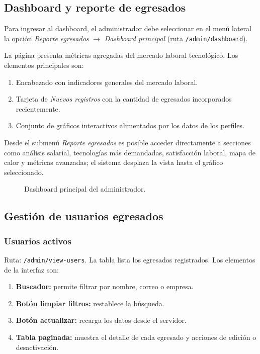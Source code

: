 \subsection{Dashboard y reporte de egresados}
\label{subsec:dashboard-admin}

Para ingresar al dashboard, el administrador debe seleccionar en el menú lateral la opción \emph{Reporte egresados} $\rightarrow$ \emph{Dashboard principal} (ruta \texttt{/admin/dashboard}).

La página presenta métricas agregadas del mercado laboral tecnológico. Los elementos principales son:

\begin{enumerate}
\item Encabezado con indicadores generales del mercado laboral.
\item Tarjeta de \emph{Nuevos registros} con la cantidad de egresados incorporados recientemente.
\item Conjunto de gráficos interactivos alimentados por los datos de los perfiles.
\end{enumerate}

Desde el submenú \emph{Reporte egresados} es posible acceder directamente a secciones como análisis salarial, tecnologías más demandadas, satisfacción laboral, mapa de calor y métricas avanzadas; el sistema desplaza la vista hasta el gráfico seleccionado.

\begin{figure}[H]
\centering
{}
\caption{Dashboard principal del administrador.}
\label{fig:dashboard-admin}
\end{figure}

\subsection{Gestión de usuarios egresados}

\subsubsection{Usuarios activos}

Ruta: \texttt{/admin/view-users}. La tabla lista los egresados registrados. Los elementos de la interfaz son:

\begin{enumerate}
\item \textbf{Buscador:} permite filtrar por nombre, correo o empresa.
\item \textbf{Botón limpiar filtros:} restablece la búsqueda.
\item \textbf{Botón actualizar:} recarga los datos desde el servidor.
\item \textbf{Tabla paginada:} muestra el detalle de cada egresado y acciones de edición o desactivación.
\end{enumerate}

